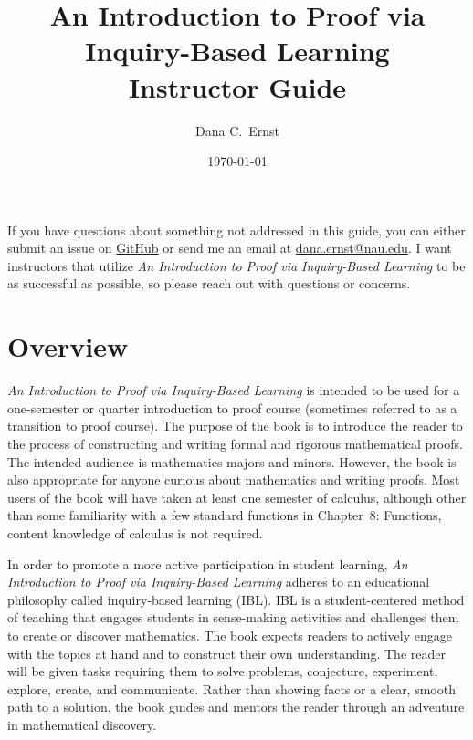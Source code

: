 \documentclass[11pt]{article}%
\newcommand{\blankline}{\pagebreak[2]\vspace{.5\baselineskip}}
\begin{document}

\title{An Introduction to Proof via Inquiry-Based Learning\\
Instructor Guide}
\author{Dana C.~Ernst}
\date{\today}

\maketitle

\begin{mdframed}[style=skeleton]
If you have questions about something not addressed in this guide, you can either submit an issue on \href{https://github.com/dcernst/IBL-IntroToProof/issues}{GitHub} or send me an email at \url{dana.ernst@nau.edu}.  I want instructors that utilize \emph{An Introduction to Proof via Inquiry-Based Learning} to be as successful as possible, so please reach out with questions or concerns.
\end{mdframed}


\section*{Overview}

\emph{An Introduction to Proof via Inquiry-Based Learning} is intended to be used for a one-semester or quarter introduction to proof course (sometimes referred to as a transition to proof course). The purpose of the book is to introduce the reader to the process of constructing and writing formal and rigorous mathematical proofs. The intended audience is mathematics majors and minors. However, the book is also appropriate for anyone curious about mathematics and writing proofs. Most users of the book will have taken at least one semester of calculus, although other than some familiarity with a few standard functions in Chapter~8: Functions, content knowledge of calculus is not required. 

\blankline

In order to promote a more active participation in student learning, \emph{An Introduction to Proof via Inquiry-Based Learning} adheres to an educational philosophy called inquiry-based learning (IBL). IBL is a student-centered method of teaching that engages students in sense-making activities and challenges them to create or discover mathematics.  The book expects readers to actively engage with the topics at hand and to construct their own understanding.  The reader will be given tasks requiring them to solve problems, conjecture, experiment, explore, create, and communicate.  Rather than showing facts or a clear, smooth path to a solution, the book guides and mentors the reader through an adventure in mathematical discovery. 
\end{document}
